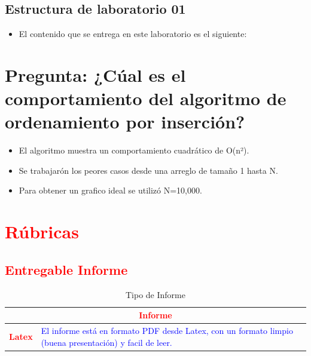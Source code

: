 \documentclass{article}
\begin{document}
	\clearpage
	
	
	

	
		
	\subsection{Estructura de laboratorio 01}
	\begin{itemize}	
		\item El contenido que se entrega en este laboratorio es el siguiente:
	\end{itemize}
	


\section{Pregunta: ¿Cúal es el comportamiento del algoritmo de ordenamiento por inserción?}
	\begin{itemize}
		\item El algoritmo muestra un comportamiento cuadrático de O(n²).
		\item Se trabajarón los peores casos desde una arreglo de tamaño 1 hasta N.
		\item Para obtener un grafico ideal se utilizó N=10,000.
	\end{itemize}		

	\section{\textcolor{red}{Rúbricas}}
	
	\subsection{\textcolor{red}{Entregable Informe}}
	\begin{table}[H]
		\caption{Tipo de Informe}
		{\renewcommand{\arraystretch}{1.5}%
		\begin{tabular}{|p{3cm}|p{12cm}|}
			\hline
			\multicolumn{2}{|c|}{\textbf{\textcolor{red}{Informe}}}  \\
			\hline 
			\textbf{\textcolor{red}{Latex}} & \textcolor{blue}{El informe está en formato PDF desde Latex,  con un formato limpio (buena presentación) y facil de leer.}   \\ 
			\hline 
			
			
		\end{tabular}
	}
	\end{table}
	
\end{document}

